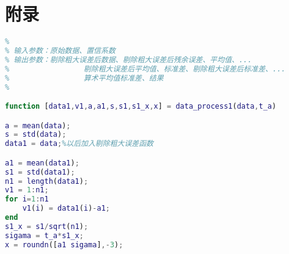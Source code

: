 \part*{附录}

\begin{lstlisting}[language=Matlab]
% 等精度测量数据误差分析
%
% 输入参数：原始数据、置信系数
% 输出参数：剔除粗大误差后数据、剔除粗大误差后残余误差、平均值、...
%                 剔除粗大误差后平均值、标准差、剔除粗大误差后标准差、...
%                 算术平均值标准差、结果
%

function [data1,v1,a,a1,s,s1,s1_x,x] = data_process1(data,t_a)

a = mean(data);
s = std(data);
data1 = data;%以后加入剔除粗大误差函数

a1 = mean(data1);
s1 = std(data1);
n1 = length(data1);
v1 = 1:n1;
for i=1:n1
	v1(i) = data1(i)-a1;
end
s1_x = s1/sqrt(n1);
sigama = t_a*s1_x;
x = roundn([a1 sigama],-3);
\end{lstlisting}

